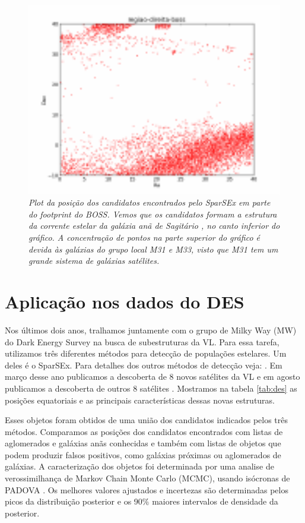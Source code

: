 \documentclass[
	12pt,				%
	openany,			%
	oneside,			%
	a4paper,			%
	english,			%
	brazil				%
	]{abntex2}
\begin{document}
\begin{figure}[H]
\begin{center}
\includegraphics[width=12cm]{figuras/sagitarius-stream.pdf}
\caption{\textit{Plot da posição dos candidatos encontrados pelo SparSEx em parte do footprint do BOSS. Vemos que os candidatos formam a estrutura da corrente estelar da galáxia anã de  Sagitário \cite{2001ApJ...547L.133I}, no canto inferior do gráfico. A concentração de pontos na parte superior do gráfico  é devida às galáxias do grupo local M31 e M33, visto que M31 tem um grande sistema de galáxias satélites. }}
\label{fig:sagstream}
\end{center}
\end{figure}
\vspace{0.5cm}

\chapter{Aplicação nos dados do DES}
\label{cha:dadosdes}
Nos últimos dois anos, tralhamos juntamente com o grupo de Milky Way (MW) do Dark Energy Survey na busca de subestruturas da VL. Para essa tarefa, utilizamos três diferentes métodos para detecção de populações estelares. Um deles é o SparSEx. Para detalhes dos outros métodos de detecção veja: \cite{2015arXiv150803622T}. Em março desse ano publicamos a descoberta de  8  novos satélites da VL \cite{2015ApJ...807...50B} e em agosto publicamos a descoberta de outros 8 satélites \cite{2015arXiv150803622T}. Mostramos na tabela \ref{tab:des} as posições equatoriais e as principais características dessas novas estruturas. \par
Esses objetos foram obtidos de uma união dos candidatos indicados pelos três métodos.  Comparamos as posições dos candidatos encontrados com listas de aglomerados e galáxias anãs conhecidas \cite{1998AJ....116.3040G,2012AJ....144....4M} e também com listas de objetos que podem produzir falsos positivos, como galáxias próximas ou aglomerados de galáxias.
A caracterização dos objetos foi determinada por uma analise de verossimilhança de Markov Chain Monte Carlo (MCMC), usando isócronas de PADOVA\cite{2012MNRAS.427..127B} . Os melhores valores ajustados e incertezas são determinadas pelos picos da distribuição posterior e os 90$\%$ maiores intervalos de densidade da posterior. 
\end{document}
